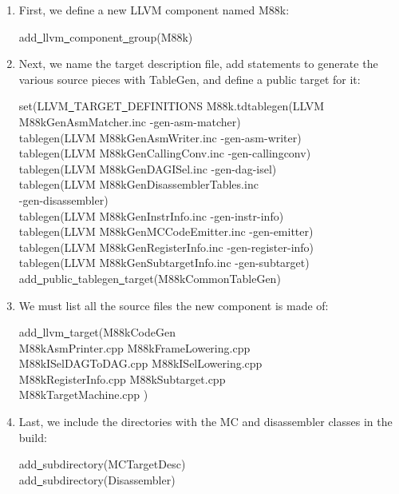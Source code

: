 \begin{enumerate}
\item First, we define a new LLVM component named M88k:
\begin{tcolorbox}[colback=white,colframe=black]
add\underline{~}llvm\underline{~}component\underline{~}group(M88k)
\end{tcolorbox}

\item Next, we name the target description file, add statements to generate the various source pieces with TableGen, and define a public target for it:
\begin{tcolorbox}[colback=white,colframe=black]
set(LLVM\underline{~}TARGET\underline{~}DEFINITIONS M88k.tdtablegen(LLVM \\
M88kGenAsmMatcher.inc -gen-asm-matcher) \\
tablegen(LLVM M88kGenAsmWriter.inc -gen-asm-writer) \\
tablegen(LLVM M88kGenCallingConv.inc -gen-callingconv) \\
tablegen(LLVM M88kGenDAGISel.inc -gen-dag-isel) \\
tablegen(LLVM M88kGenDisassemblerTables.inc \\
\hspace*{8cm}-gen-disassembler) \\
tablegen(LLVM M88kGenInstrInfo.inc -gen-instr-info) \\
tablegen(LLVM M88kGenMCCodeEmitter.inc -gen-emitter) \\
tablegen(LLVM M88kGenRegisterInfo.inc -gen-register-info) \\
tablegen(LLVM M88kGenSubtargetInfo.inc -gen-subtarget) \\
add\underline{~}public\underline{~}tablegen\underline{~}target(M88kCommonTableGen)
\end{tcolorbox}

\item We must list all the source files the new component is made of:
\begin{tcolorbox}[colback=white,colframe=black]
add\underline{~}llvm\underline{~}target(M88kCodeGen \\
\hspace*{0.5cm}M88kAsmPrinter.cpp M88kFrameLowering.cpp \\
\hspace*{0.5cm}M88kISelDAGToDAG.cpp M88kISelLowering.cpp \\
\hspace*{0.5cm}M88kRegisterInfo.cpp M88kSubtarget.cpp \\
\hspace*{0.5cm}M88kTargetMachine.cpp )
\end{tcolorbox}

\item Last, we include the directories with the MC and disassembler classes in the build:
\begin{tcolorbox}[colback=white,colframe=black]
add\underline{~}subdirectory(MCTargetDesc) \\
add\underline{~}subdirectory(Disassembler)
\end{tcolorbox}

\end{enumerate}

